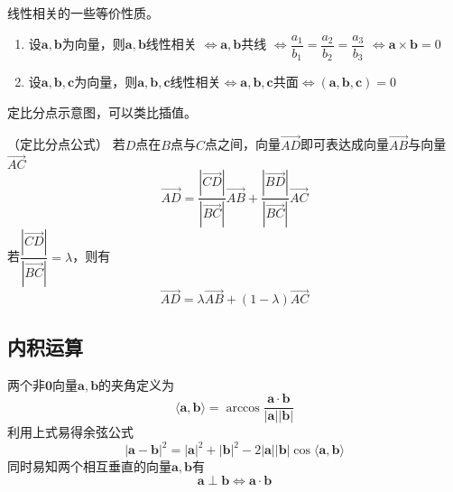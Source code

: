 \begin{theorem}
    线性相关的一些等价性质。
    \begin{enumerate}[(1)]
        \item 设$\bm{a},\bm{b}$为向量，则$\bm{a},\bm{b}$线性相关
              $\iff \bm{a},\bm{b}$共线
              $\iff \dfrac{a_1}{b_1}=\dfrac{a_2}{b_2}=\dfrac{a_3}{b_3}$
              $\iff \bm{a}\times\bm{b}=0$
        \item 设$\bm{a},\bm{b},\bm{c}$为向量，则$\bm{a},\bm{b},\bm{c}$线性相关$\iff\bm{a},\bm{b},\bm{c}$共面$\iff(\bm{a},\bm{b},\bm{c})=0$
    \end{enumerate}
\end{theorem}
\pagebreak
\begin{marginfigure}
    \centering
    \caption{定比分点示意图，可以类比插值。}
\end{marginfigure}
\begin{theorem}
    （定比分点公式）
    若$D$点在$B$点与$C$点之间，向量$\overrightarrow{AD}$即可表达成向量$\overrightarrow{AB}$与向量$\overrightarrow{AC}$
    \[ \overrightarrow{AD} = \frac{|\overrightarrow{CD}|}{|\overrightarrow{BC}|}\overrightarrow{AB} + \frac{|\overrightarrow{BD}|}{|\overrightarrow{BC}|}\overrightarrow{AC} \]
    若$\dfrac{|\overrightarrow{CD}|}{|\overrightarrow{BC}|} = \lambda$，则有
    \[ \overrightarrow{AD} = \lambda\overrightarrow{AB} + (1-\lambda)\overrightarrow{AC} \]
\end{theorem}

\subsection{内积运算}
两个非$\bm{0}$向量$\bm{a},\bm{b}$的夹角定义为
\begin{equation}
    \langle\bm{a},\bm{b}\rangle = \arccos \frac{\bm{a}\cdot\bm{b}}{|\bm{a}||\bm{b}|}
\end{equation}
利用上式易得余弦公式
\begin{equation}
    \label{eq:余弦公式}
    |\bm{a}-\bm{b}|^2 = |\bm{a}|^2 + |\bm{b}|^2 - 2|\bm{a}||\bm{b}|\cos\langle\bm{a},\bm{b}\rangle
\end{equation}
同时易知两个相互垂直的向量$\bm{a},\bm{b}$有
\[ \bm{a}\perp\bm{b} \iff \bm{a}\cdot\bm{b} \]

